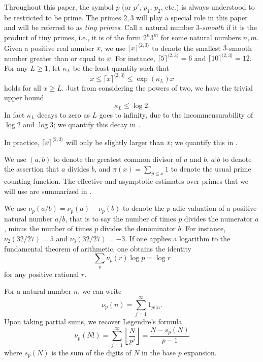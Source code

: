 \documentclass[12pt,a4paper,reqno]{amsart}
\numberwithin{equation}{section}
\theoremstyle{plain}
\theoremstyle{definition}
\begin{document}
Throughout this paper, the symbol $p$ (or $p'$, $p_1$, $p_2$, etc.) is always understood to be restricted to be prime.  The primes $2,3$ will play a special role in this paper and will be referred to as \emph{tiny primes}. 
Call a natural number \emph{$3$-smooth} if it is the product of tiny primes, i.e., it is of the form $2^n 3^m$ for some natural numbers $n,m$.  Given a positive real number $x$, we use $\lceil x \rceil^{\langle 2,3 \rangle}$ to denote the smallest $3$-smooth number greater than or equal to $x$.  For instance, $\lceil 5 \rceil^{\langle 2,3 \rangle} = 6$ and $\lceil 10 \rceil^{\langle 2,3 \rangle} = 12$. 
For any $L \geq 1$, let $\kappa_L$ be the least quantity such that
\begin{equation}\label{kappa-def}  
  x \leq \lceil x \rceil^{\langle 2,3\rangle} \leq \exp(\kappa_L) x 
\end{equation}
holds for all $x \geq L$. Just from considering the powers of two, we have the trivial upper bound
\begin{equation}\label{kl-triv}
  \kappa_L \leq \log 2.
\end{equation}
In fact $\kappa_L$ decays to zero as $L$ goes to infinity, due to the incommensurability of $\log 2$ and $\log 3$; we quantify this decay in . 

In practice, $\lceil x \rceil^{\langle 2,3 \rangle}$ will only be slightly larger than $x$; we quantify this in .

We use $(a,b)$ to denote the greatest common divisor of $a$ and $b$, $a|b$ to denote the assertion that $a$ divides $b$, and $\pi(x) = \sum_{p \leq x} 1$ to denote the usual prime counting function. The effective and asymptotic estimates over primes that we will use are summarized in .

We use $\nu_p(a/b) = \nu_p(a)-\nu_p(b)$ to denote the $p$-adic valuation of a positive natural number $a/b$, that is to say the number of times $p$ divides the numerator $a$, minus the number of times $p$ divides the denominator $b$.  For instance, $\nu_2(32/27)=5$ and $\nu_3(32/27)=-3$. 
If one applies a logarithm to the fundamental theorem of arithmetic, one obtains the identity
\begin{equation}\label{ftoa}
  \sum_p \nu_p(r) \log p = \log r
\end{equation}
for any positive rational $r$.  

For a natural number $n$, we can write
\begin{equation}\label{nup-form} 
  \nu_p(n) = \sum_{j=1}^\infty 1_{p^j|n}.
\end{equation}
Upon taking partial sums, we recover Legendre's formula
\begin{equation}\label{legendre}
  \nu_p(N!) = \sum_{j=1}^\infty \left\lfloor \frac{N}{p^j} \right\rfloor = \frac{N - s_p(N)}{p-1}
\end{equation}
where $s_p(N)$ is the sum of the digits of $N$ in the base $p$ expansion.
\end{document}
